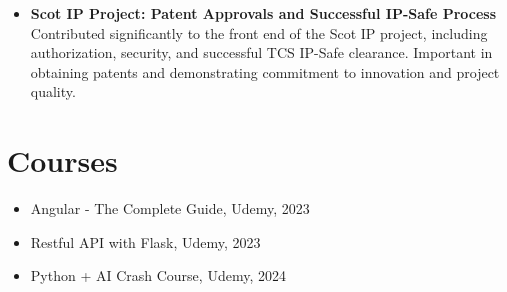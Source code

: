 \documentclass[letterpaper,10pt]{article}
\begin{document}
\begin{multicols}{2}
\begin{itemize}
    \item \textbf{Scot IP Project: Patent Approvals and Successful IP-Safe Process} \\
    Contributed significantly to the front end of the Scot IP project, including authorization, security, and successful TCS IP-Safe clearance. Important in obtaining patents and demonstrating commitment to innovation and project quality.
\end{itemize}

\section*{\textcolor{headercolor}{Courses}}
\begin{itemize}
    \item Angular - The Complete Guide, Udemy, 2023
    \item Restful API with Flask, Udemy, 2023
    \item Python + AI Crash Course, Udemy, 2024
\end{itemize}

\end{multicols}

 
\end{document}
